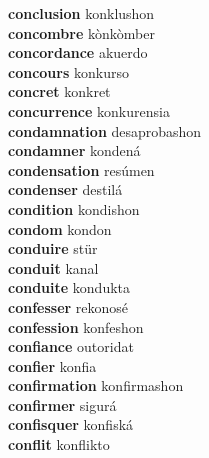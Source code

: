 \textbf{conclusion } konklushon \\
\textbf{concombre } kònkòmber \\
\textbf{concordance } akuerdo \\
\textbf{concours } konkurso \\
\textbf{concret } konkret \\
\textbf{concurrence } konkurensia \\
\textbf{condamnation } desaprobashon \\
\textbf{condamner } kondená \\
\textbf{condensation } resúmen \\
\textbf{condenser } destilá \\
\textbf{condition } kondishon \\
\textbf{condom } kondon \\
\textbf{conduire } stür \\
\textbf{conduit } kanal \\
\textbf{conduite } kondukta \\
\textbf{confesser } rekonosé \\
\textbf{confession } konfeshon \\
\textbf{confiance } outoridat \\
\textbf{confier } konfia \\
\textbf{confirmation } konfirmashon \\
\textbf{confirmer } sigurá \\
\textbf{confisquer } konfiská \\
\textbf{conflit } konflikto \\
